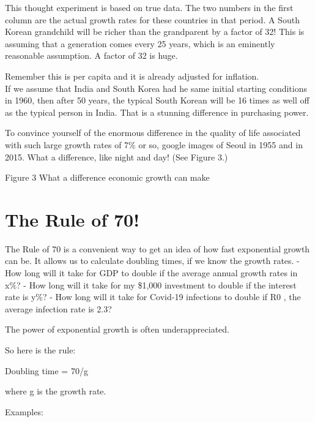 \documentclass[
]{book}
\begin{document}
This thought experiment is based on true data. The two numbers in the first column are the actual growth rates for these countries in that period. A South Korean grandchild will be richer than the grandparent by a factor of 32! This is assuming that a generation comes every 25 years, which is an eminently reasonable assumption. A factor of 32 is huge.

Remember this is per capita and it is already adjusted for inflation.\\
If we assume that India and South Korea had he same initial starting conditions in 1960, then after 50 years, the typical South Korean will be 16 times as well off as the typical person in India. That is a stunning difference in purchasing power.

To convince yourself of the enormous difference in the quality of life associated with such large growth rates of 7\% or so, google images of Seoul in 1955 and in 2015. What a difference, like night and day! (See Figure 3.)

Figure 3 What a difference economic growth can make

\hypertarget{the-rule-of-70}{%
\section{The Rule of 70!}\label{the-rule-of-70}}

The Rule of 70 is a convenient way to get an idea of how fast exponential growth can be. It allows us to calculate doubling times, if we know the growth rates.
- How long will it take for GDP to double if the average annual growth rates in x\%?
- How long will it take for my \$1,000 investment to double if the interest rate is y\%?
- How long will it take for Covid-19 infections to double if R0 , the average infection rate is 2.3?

The power of exponential growth is often underappreciated.

So here is the rule:

Doubling time = 70/g

where g is the growth rate.

Examples:
\end{document}
